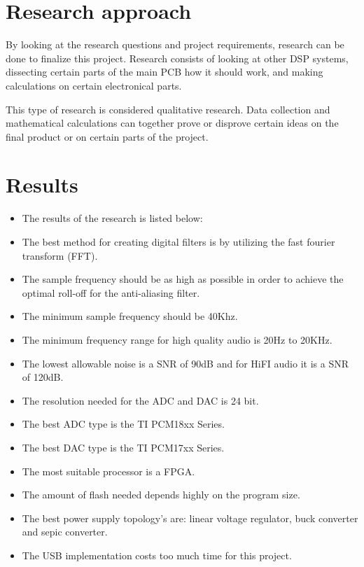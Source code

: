 \section{Research approach}

By looking at the research questions and project requirements, research can be done to finalize this project. Research consists of looking at other DSP systems, dissecting certain parts of the main PCB how it should work, and making calculations on certain electronical parts.  
\par
\noindent This type of research is considered qualitative research. Data collection and mathematical calculations can together prove or disprove certain ideas on the final product or on certain parts of the project.

\section{Results}
\begin{itemize} %
	\setlength\itemsep{-0.3em} %
		\item The results of the research is listed below:
		\item The best method for creating digital filters is by utilizing the fast fourier transform (FFT).
		\item The sample frequency should be as high as possible in order to achieve the optimal roll-off for the anti-aliasing filter. 
		\item The minimum sample frequency should be 40Khz.
		\item The minimum frequency range for high quality audio is 20Hz to 20KHz.
		\item The lowest allowable noise is a SNR of 90dB and for HiFI audio it is a SNR of 120dB.
		\item The resolution needed for the ADC and DAC is 24 bit.
		\item The best ADC type is the TI PCM18xx Series.
		\item The best DAC type is the TI PCM17xx Series.
		\item The most suitable processor is a FPGA.
		\item The amount of flash needed depends highly on the program size.
		\item The best power supply topology's are: linear voltage regulator, buck converter and sepic converter.
		\item The USB implementation costs too much time for this project.
\end{itemize} 